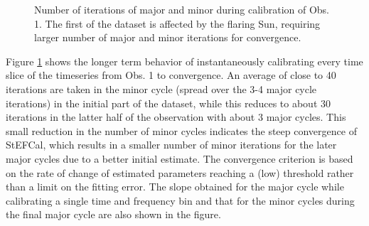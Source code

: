 \documentclass[referee]{aa}
\begin{document}
\begin{figure}[tbh]

\caption{\label{fig:Major-and-minor}Number  of  iterations  of major  and  minor
  during calibration  of Obs.  1. The first  of the  dataset is affected  by the
  flaring  Sun,  requiring larger  number  of  major  and minor  iterations  for
  convergence.}
\end{figure}


Figure   \ref{fig:Major-and-minor}   shows   the   longer  term   behavior   of
instantaneously calibrating  every time slice  of the timeseries  from Obs.  1 to
convergence. An average  of close to 40 iterations are taken  in the minor cycle
(spread over the 3-4 major cycle iterations) in the initial part of the dataset,
while this reduces to about 30  iterations in the latter half of the observation
with about  3 major cycles. This small  reduction in the number  of minor cycles
indicates the steep convergence of StEFCal, which results in a smaller number of
minor  iterations  for   the  later  major  cycles  due   to  a  better  initial
estimate. The convergence criterion is based  on the rate of change of estimated
parameters  reaching a  (low)  threshold rather  than  a limit  on the  fitting
error. The  slope obtained for the  major cycle while calibrating  a single time
and frequency  bin and that for the  minor cycles during the  final major cycle
are also shown in the figure.
\end{document}
